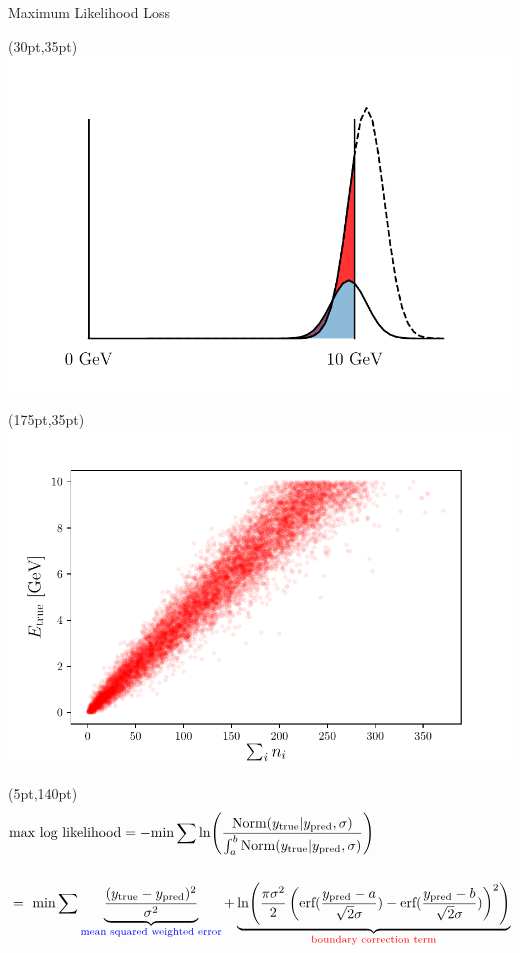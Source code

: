 \documentclass[10pt]{beamer}
\begin{document}
\begin{frame}{Maximum Likelihood Loss}
  \begin{textblock*}{150pt}(30pt,35pt)
      \includegraphics[width=\textwidth]{../images/gaussian_shift.png}
  \end{textblock*}
  \begin{textblock*}{150pt}(175pt,35pt)
      \includegraphics[width=\textwidth]{../images/e-vs-sum_n.png}
  \end{textblock*}

  \begin{textblock*}{150pt}(5pt,140pt)
    \begin{align*}
      &\text{max log likelihood} = -\text{min} \sum \ln(\frac{\text{Norm}(y_{\text{true}} | y_{\text{pred}}, \sigma)}{\int^b_a \text{Norm}(y_{\text{true}} | y_{\text{pred}}, \sigma)})\\ \\
                                            &=\ \text{min} \sum \underbrace{\frac{(y_{\text{true}}-y_{\text{pred}})^2}{\sigma^2}}_{\text{\textcolor{blue}{mean squared weighted error}}} +\underbrace{\ln(\frac{\pi \sigma^2}{2} \left(\text{erf}(\frac{y_{\text{pred}}-a}{\sqrt{2}\sigma}) - \text{erf}(\frac{y_{\text{pred}}-b}{\sqrt{2}\sigma})\right)^2)}_{\text{\textcolor{red}{boundary correction term}}}
    \end{align*}
  \end{textblock*}


\end{frame}
\end{document}
